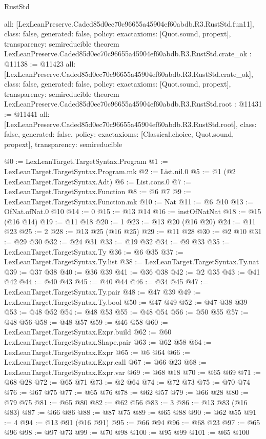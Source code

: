 \begin{lexlean}{RustStd}
\begin{coremodule}
{  all: [LexLeanPreserve.Caded85d0ec70c96655a45904ef60abdb.R3.RustStd.fun11],
  class: false,
  generated: false,
  policy: exact{axioms: [Quot.sound, propext]},
  transparency: semireducible
}
theorem LexLeanPreserve.Caded85d0ec70c96655a45904ef60abdb.R3.RustStd.crate_ok : @11138 := @11423 {
  all: [LexLeanPreserve.Caded85d0ec70c96655a45904ef60abdb.R3.RustStd.crate_ok],
  class: false,
  generated: false,
  policy: exact{axioms: [Quot.sound, propext]},
  transparency: semireducible
}
theorem LexLeanPreserve.Caded85d0ec70c96655a45904ef60abdb.R3.RustStd.root : @11431 := @11441 {
  all: [LexLeanPreserve.Caded85d0ec70c96655a45904ef60abdb.R3.RustStd.root],
  class: false,
  generated: false,
  policy: exact{axioms: [Classical.choice, Quot.sound, propext]},
  transparency: semireducible
}

@0 := LexLeanTarget.TargetSyntax.Program
@1 := LexLeanTarget.TargetSyntax.Program.mk
@2 := List.nil.{0}
@5 := @1 (@2 LexLeanTarget.TargetSyntax.Adt)
@6 := List.cons.{0}
@7 := LexLeanTarget.TargetSyntax.Function
@8 := @6 @7
@9 := LexLeanTarget.TargetSyntax.Function.mk
@10 := Nat
@11 := @6 @10
@13 := OfNat.ofNat.{0} @10
@14 := 0
@15 := @13 @14
@16 := instOfNatNat
@18 := @15 (@16 @14)
@19 := @11 @18
@20 := 1
@23 := @13 @20 (@16 @20)
@24 := @11 @23
@25 := 2
@28 := @13 @25 (@16 @25)
@29 := @11 @28
@30 := @2 @10
@31 := @29 @30
@32 := @24 @31
@33 := @19 @32
@34 := @9 @33
@35 := LexLeanTarget.TargetSyntax.Ty
@36 := @6 @35
@37 := LexLeanTarget.TargetSyntax.Ty.list
@38 := LexLeanTarget.TargetSyntax.Ty.nat
@39 := @37 @38
@40 := @36 @39
@41 := @36 @38
@42 := @2 @35
@43 := @41 @42
@44 := @40 @43
@45 := @40 @44
@46 := @34 @45
@47 := LexLeanTarget.TargetSyntax.Ty.pair
@48 := @47 @39
@49 := LexLeanTarget.TargetSyntax.Ty.bool
@50 := @47 @49
@52 := @47 @38 @39
@53 := @48 @52
@54 := @48 @53
@55 := @48 @54
@56 := @50 @55
@57 := @48 @56
@58 := @48 @57
@59 := @46 @58
@60 := LexLeanTarget.TargetSyntax.Expr.build
@62 := @60 LexLeanTarget.TargetSyntax.Shape.pair
@63 := @62 @58
@64 := LexLeanTarget.TargetSyntax.Expr
@65 := @6 @64
@66 := LexLeanTarget.TargetSyntax.Expr.call
@67 := @66 @23
@68 := LexLeanTarget.TargetSyntax.Expr.var
@69 := @68 @18
@70 := @65 @69
@71 := @68 @28
@72 := @65 @71
@73 := @2 @64
@74 := @72 @73
@75 := @70 @74
@76 := @67 @75
@77 := @65 @76
@78 := @62 @57
@79 := @66 @28
@80 := @79 @75
@81 := @65 @80
@82 := @62 @56
@83 := 3
@86 := @13 @83 (@16 @83)
@87 := @66 @86
@88 := @87 @75
@89 := @65 @88
@90 := @62 @55
@91 := 4
@94 := @13 @91 (@16 @91)
@95 := @66 @94
@96 := @68 @23
@97 := @65 @96
@98 := @97 @73
@99 := @70 @98
@100 := @95 @99
@101 := @65 @100

\end{coremodule}
\end{lexlean}
